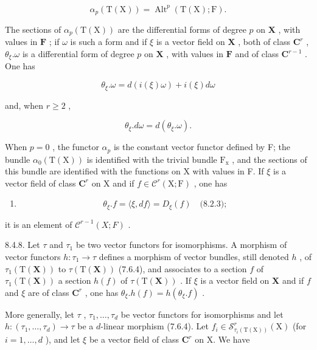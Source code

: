 \[
\alpha_ {p} (\mathrm{T} (\mathrm{X})) = \operatorname{Alt}^{p}(\mathrm{T} (\mathrm{X}); \mathrm{F}).
\]

The sections of \(\alpha_{p}(\mathrm{T}(\mathrm{X}))\) are the differential forms of degree \(p\) on \(\mathbf{X}\) , with values in \(\mathbf{F}\) ; if \(\omega\) is such a form and if \(\xi\) is a vector field on \(\mathbf{X}\) , both of class \(\mathbf{C}^{r}\) , \(\theta_{\xi}.\omega\) is a differential form of degree \(p\) on \(\mathbf{X}\) , with values in \(\mathbf{F}\) and of class \(\mathbf{C}^{r-1}\) . One has

\[
\theta_ {\xi}. \omega = d (i (\xi) \omega) + i (\xi) d \omega\tag{3}
\]

and, when \(r \geqslant 2\) ,

\[
\theta_ {\xi}. d \omega = d (\theta_ {\xi}. \omega).\tag{4}
\]

When \(p=0\) , the functor \(\alpha_{p}\) is the constant vector functor defined by F; the bundle \(\alpha_{0}(\mathrm{T}(\mathrm{X}))\) is identified with the trivial bundle \(\mathrm{F}_{\mathrm{x}}\) , and the sections of this bundle are identified with the functions on X with values in F. If \(\xi\) is a vector field of class \(\mathbf{C}^{r}\) on X and if \(f\in\mathcal{C}^{r}(\mathrm{X};\mathrm{F})\) , one has

\begin{enumerate}
\def\labelenumi{(\arabic{enumi})}
\setcounter{enumi}{4}
\tightlist
\item
  \[
  \theta_ {\xi}. f = \langle \xi , d f \rangle = D _ {\xi} (f) \quad \text{(8.2.3)};
  \]
\end{enumerate}

it is an element of \(\mathcal{C}^{r-1}(X;F)\) .

8.4.8. Let \(\tau\) and \(\tau_{1}\) be two vector functors for isomorphisms. A morphism of vector functors \(h\colon \tau_{1}\to \tau\) defines a morphism of vector bundles, still denoted \(h\) , of \(\tau_{1}(\mathrm{T}(\mathbf{X}))\) to \(\tau (\mathrm{T}(\mathbf{X}))\) (7.6.4), and associates to a section \(f\) of \(\tau_{1}(\mathrm{T}(\mathbf{X}))\) a section \(h(f)\) of \(\tau (\mathrm{T}(\mathbf{X}))\) . If \(\xi\) is a vector field on \(\mathbf{X}\) and if \(f\) and \(\xi\) are of class \(\mathbf{C}^r\) , one has \(\theta_{\xi}.h(f) = h(\theta_{\xi}.f)\) .

More generally, let \(\tau\) , \(\tau_{1},\ldots,\tau_{d}\) be vector functors for isomorphisms and let \(h\colon(\tau_{1},\ldots,\tau_{d})\to\tau\) be a \(d\)-linear morphism (7.6.4). Let \(f_{i}\in\mathcal{S}_{\tau_{i}(\mathrm{T}(\mathrm{X}))}^{r}(\mathrm{X})\) (for \(i=1,\ldots,d\) ), and let \(\xi\) be a vector field of class \(\mathbf{C}^{r}\) on X. We have

